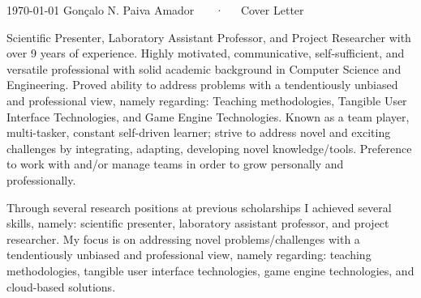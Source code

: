 \documentclass[11pt, a4paper]{awesome-cv}
\begin{document}
\makecvheader[C]

\makecvfooter
  {\today}
  {Gon\c{c}alo N. Paiva Amador ~~~·~~~Cover Letter}
  {}

\makelettertitle

\begin{cvletter}

Scientific Presenter, Laboratory Assistant Professor, and Project Researcher with over 9 years of experience.
Highly motivated, communicative, self-sufficient, and versatile professional with solid academic background in Computer Science and Engineering. 
Proved ability to address problems with a tendentiously unbiased and professional view, namely regarding: Teaching methodologies, Tangible User Interface Technologies, and Game Engine Technologies.
Known as a team player, multi-tasker, constant self-driven learner; strive to address novel and exciting challenges by integrating, adapting, developing novel knowledge/tools.
Preference to work with and/or manage teams in order to grow personally and professionally.


Through several research positions at previous scholarships I achieved several skills, namely: scientific presenter, laboratory assistant professor, and project researcher. 
My focus is on addressing novel problems/challenges with a tendentiously unbiased and professional view, namely regarding: teaching methodologies, tangible user interface technologies, game engine technologies, and cloud-based solutions.



\end{cvletter}
\end{document}
